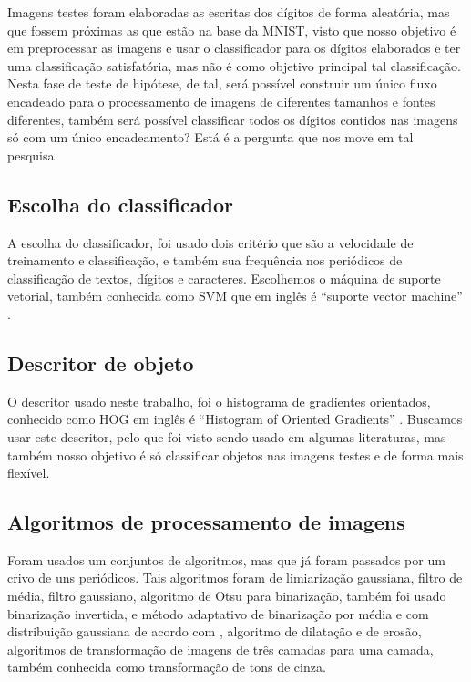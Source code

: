 \documentclass[fleqn,12pt]{SelfArx} %
\begin{document}
Imagens testes foram elaboradas as escritas dos dígitos de forma aleatória,  mas
que fossem próximas as que estão na base da MNIST, visto que nosso objetivo é em
preprocessar as imagens e usar o classificador para os dígitos elaborados e ter
uma classificação satisfatória, mas não é como objetivo principal tal
classificação. Nesta fase de teste de hipótese, de tal, será possível construir
um único fluxo encadeado para o processamento de imagens de diferentes tamanhos
e fontes diferentes, também será possível classificar todos os dígitos contidos
nas imagens só com um único encadeamento? Está é a pergunta que nos move em tal
pesquisa.

\subsection{Escolha do classificador}

 A escolha do classificador, foi usado dois critério que são a velocidade de
treinamento e classificação, e também sua frequência nos periódicos de
classificação de textos, dígitos e caracteres. Escolhemos o máquina de suporte
vetorial, também conhecida como SVM que em inglês é ``suporte vector machine''
\cite{ANIL2015}.

\subsection{Descritor de objeto}

O descritor usado neste trabalho, foi o histograma de gradientes orientados,
conhecido como HOG em inglês é ``Histogram of Oriented Gradients''
\cite{NEWELL2011}. Buscamos usar este descritor, pelo que foi visto sendo usado
em algumas literaturas, mas também nosso objetivo é só classificar objetos nas
imagens testes e de forma mais flexível.

\subsection{Algoritmos de processamento de imagens}

Foram usados um conjuntos de algoritmos, mas que já foram passados por um crivo
de uns periódicos. Tais algoritmos foram de limiarização gaussiana, filtro de
média, filtro gaussiano, algoritmo de Otsu para binarização, também foi usado
binarização invertida, e método adaptativo de binarização por média e com
distribuição gaussiana de acordo com \cite{GUPTA2007}, algoritmo de dilatação e
de erosão, algoritmos de transformação de imagens de três camadas para uma
camada, também conhecida como transformação de tons de cinza.
\end{document}
